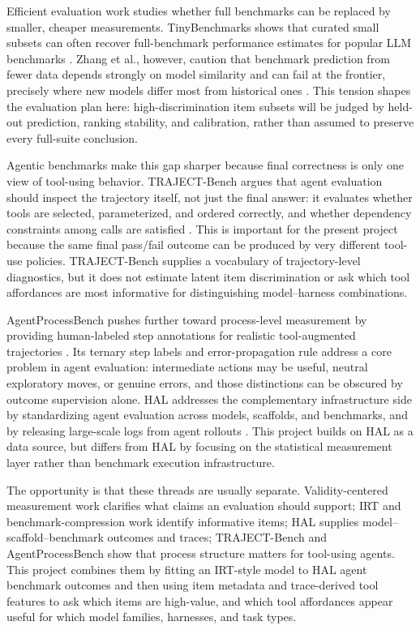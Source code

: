 \documentclass{article}
\begin{document}
Efficient evaluation work studies whether full benchmarks can be replaced by smaller, cheaper measurements. TinyBenchmarks shows that curated small subsets can often recover full-benchmark performance estimates for popular LLM benchmarks \citep{maiapolo2024tinybenchmarks}. Zhang et al., however, caution that benchmark prediction from fewer data depends strongly on model similarity and can fail at the frontier, precisely where new models differ most from historical ones \citep{zhang2025missesmark}. This tension shapes the evaluation plan here: high-discrimination item subsets will be judged by held-out prediction, ranking stability, and calibration, rather than assumed to preserve every full-suite conclusion.

Agentic benchmarks make this gap sharper because final correctness is only one view of tool-using behavior. TRAJECT-Bench argues that agent evaluation should inspect the trajectory itself, not just the final answer: it evaluates whether tools are selected, parameterized, and ordered correctly, and whether dependency constraints among calls are satisfied \citep{he2025traject}. This is important for the present project because the same final pass/fail outcome can be produced by very different tool-use policies. TRAJECT-Bench supplies a vocabulary of trajectory-level diagnostics, but it does not estimate latent item discrimination or ask which tool affordances are most informative for distinguishing model--harness combinations.

AgentProcessBench pushes further toward process-level measurement by providing human-labeled step annotations for realistic tool-augmented trajectories \citep{fan2026agentprocessbench}. Its ternary step labels and error-propagation rule address a core problem in agent evaluation: intermediate actions may be useful, neutral exploratory moves, or genuine errors, and those distinctions can be obscured by outcome supervision alone. HAL addresses the complementary infrastructure side by standardizing agent evaluation across models, scaffolds, and benchmarks, and by releasing large-scale logs from agent rollouts \citep{hal2026}. This project builds on HAL as a data source, but differs from HAL by focusing on the statistical measurement layer rather than benchmark execution infrastructure.

The opportunity is that these threads are usually separate. Validity-centered measurement work clarifies what claims an evaluation should support; IRT and benchmark-compression work identify informative items; HAL supplies model--scaffold--benchmark outcomes and traces; TRAJECT-Bench and AgentProcessBench show that process structure matters for tool-using agents. This project combines them by fitting an IRT-style model to HAL agent benchmark outcomes and then using item metadata and trace-derived tool features to ask which items are high-value, and which tool affordances appear useful for which model families, harnesses, and task types.
\end{document}

